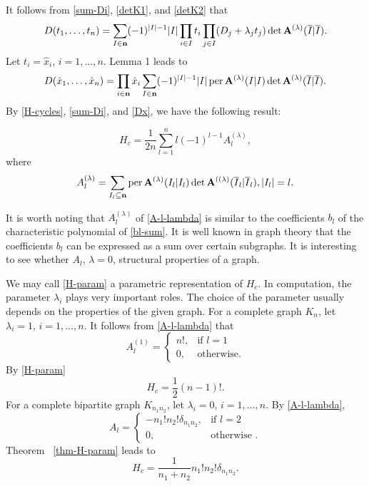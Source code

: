 It follows from \eqref{sum-Di}, \eqref{detK1}, and \eqref{detK2} that
\begin{equation}\label{Dt}
D(t_1,\dots,t_n)=\sum_{I\in\bold n}(-1)^{|I|-1}|I|
\prod_{i\in I}t_i\prod_{j\in I}(D_j+\lambda_jt_j)\det\bold A^{(\lambda)}
(\overline I|\overline I).
\end{equation}
Let $t_i=\hat x_i$, $i=1,\dots,n$. Lemma 1 leads to
\begin{equation}\label{Dx}
D(\hat x_1,\dots,\hat x_n)=\prod_{i\in\bold n}\hat x_i
\sum_{I\in\bold n}(-1)^{|I|-1}|I|\operatorname{per} \bold A
^{(\lambda)}(I|I)\det\bold A^{(\lambda)}(\overline I|\overline I).
\end{equation}
By \eqref{H-cycles}, \eqref{sum-Di}, and \eqref{Dx},
we have the following result:
{\samepage
\begin{thm}\label{thm-H-param}
\begin{equation}\label{H-param}
H_c=\frac{1}{2n}\sum^n_{l =1}l (-1)^{l -1}A_{l}
^{(\lambda)},
\end{equation}
where
\begin{equation}\label{A-l-lambda}
A^{(\lambda)}_l =\sum_{I_l \subseteq\bold n}\operatorname{per} \bold A
^{(\lambda)}(I_l |I_l )\det\bold A^{((\lambda)}
(\overline I_{l}|\overline I_l ),|I_{l}|=l .
\end{equation}
\end{thm}
}

It is worth noting that $A_l ^{(\lambda)}$ of \eqref{A-l-lambda} is
similar to the coefficients $b_l $ of the characteristic polynomial of
\eqref{bl-sum}. It is well known in graph theory that the coefficients
$b_l $ can be expressed as a sum over certain subgraphs. It is
interesting to see whether $A_l $, $\lambda=0$, structural properties
of a graph.

We may call \eqref{H-param} a parametric representation of $H_c$. In
computation, the parameter $\lambda_i$ plays very important roles. The
choice of the parameter usually depends on the properties of the given
graph. For a complete graph $K_n$, let $\lambda_i=1$, $i=1,\dots,n$.
It follows from \eqref{A-l-lambda} that
\begin{equation}\label{compl-gr}
A^{(1)}_l =\begin{cases} n!,&\text{if }l =1\\
0,&\text{otherwise}.\end{cases}
\end{equation}
By \eqref{H-param}
\begin{equation}
H_c=\frac 12(n-1)!.
\end{equation}
For a complete bipartite graph $K_{n_1n_2}$, let $\lambda_i=0$, $i=1,\dots,n$.
By \eqref{A-l-lambda},
\begin{equation}
A_l =
\begin{cases} -n_1!n_2!\delta_{n_1n_2},&\text{if }l =2\\
0,&\text{otherwise }.\end{cases}
\label{compl-bip-gr}
\end{equation}
Theorem ~\ref{thm-H-param}
leads to
\begin{equation}
H_c=\frac1{n_1+n_2}n_1!n_2!\delta_{n_1n_2}.
\end{equation}

